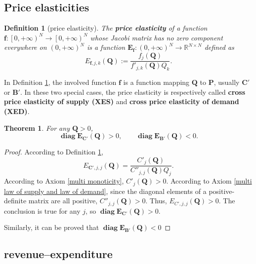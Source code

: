 \documentclass{article}
\newtheorem{theorem}{Theorem}[subsection]
\newtheorem{definition}{Definition}[subsection]
\begin{document}
\subsection{Price elasticities}

\begin{definition}[price elasticity]
\label{multi price elasticity}
The \textbf{price elasticity} of a function $\mathbf f:\left[0,+\infty\right)^N\to\left[0,+\infty\right)^N$ whose Jacobi matrix has no zero component everywhere on $\left(0,+\infty\right)^N$ is a function $\mathbf E_\mathbf f:\left(0,+\infty\right)^N\to\mathbb R^{N\times N}$ defined as
$$E_{\mathbf f,j,k}\!\left(\mathbf Q\right):=\frac{f_j\!\left(\mathbf Q\right)}{f'_{j,k}\!\left(\mathbf Q\right)Q_k}.$$
\end{definition}

In Definition \ref{multi price elasticity}, the involved function $\mathbf f$ is a function mapping $\mathbf Q$ to $\mathbf P$,
usually $\mathbf C'$ or $\mathbf B'$.
In these two special cases, the price elasticity is respectively called \textbf{cross price elasticity of supply (XES)} and \textbf{cross price elasticity of demand (XED)}.

\begin{theorem}
For any $\mathbf Q>0$,
$$\operatorname{\mathbf{diag}}\mathbf E_{\mathbf C'}\!\left(\mathbf Q\right)>0,\qquad\operatorname{\mathbf{diag}}\mathbf E_{\mathbf B'}\!\left(\mathbf Q\right)<0.$$
\end{theorem}
\begin{proof}
According to Definition \ref{multi price elasticity},
$$E_{\mathbf C',j,j}\!\left(\mathbf Q\right)=\frac{C'_j\!\left(\mathbf Q\right)}{C''_{j,j}\!\left(\mathbf Q\right)Q_j}.$$
According to Axiom \ref{multi monoticity}, $C'_j\!\left(\mathbf Q\right)>0$.
According to Axiom \ref{multi law of supply and law of demand},
since the diagonal elements of a positive-definite matrix are all positive,
$C''_{j,j}\!\left(\mathbf Q\right)>0$.
Thus, $E_{C',j,j}\!\left(\mathbf Q\right)>0$.
The conclusion is true for any $j$, so $\operatorname{\mathbf{diag}}\mathbf E_{\mathbf C'}\!\left(\mathbf Q\right)>0$.

Similarly, it can be proved that $\operatorname{\mathbf{diag}}\mathbf E_{\mathbf B'}\!\left(\mathbf Q\right)<0$
\end{proof}

\subsection{revenue--expenditure}
\end{document}
